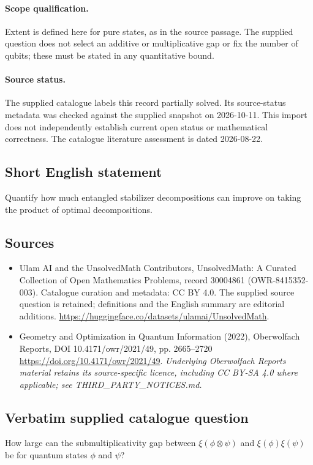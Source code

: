 \documentclass[11pt]{article}
\begin{document}
\paragraph{Scope qualification.}
Extent is defined here for pure states, as in the source passage. The supplied question does not select an additive or multiplicative gap or fix the number of qubits; these must be stated in any quantitative bound.
\paragraph{Source status.}
The supplied catalogue labels this record partially solved. Its source-status metadata was checked against the supplied snapshot on 2026-10-11. This import does not independently establish current open status or mathematical correctness. The catalogue literature assessment is dated 2026-08-22.
\subsection{Short English statement}
Quantify how much entangled stabilizer decompositions can improve on taking the product of optimal decompositions.
\subsection{Sources}
\begin{itemize}
\item[S1] Ulam AI and the UnsolvedMath Contributors, UnsolvedMath: A Curated Collection of Open Mathematics Problems, record 30004861 (OWR-8415352-003). Catalogue curation and metadata: CC BY 4.0. The supplied source question is retained; definitions and the English summary are editorial additions.
\url{https://huggingface.co/datasets/ulamai/UnsolvedMath}.
\item[S2] Geometry and Optimization in Quantum Information (2022), Oberwolfach Reports, DOI 10.4171/owr/2021/49, pp. 2665--2720
\url{https://doi.org/10.4171/owr/2021/49}.
\textit{Underlying Oberwolfach Reports material retains its source-specific licence, including CC BY-SA 4.0 where applicable; see THIRD\_PARTY\_NOTICES.md.}
\end{itemize}
\subsection{Verbatim supplied catalogue question}
How large can the submultiplicativity gap between $\xi(\phi\otimes\psi)$ and $\xi(\phi)\xi(\psi)$ be for quantum states $\phi$ and $\psi$?
\end{document}
